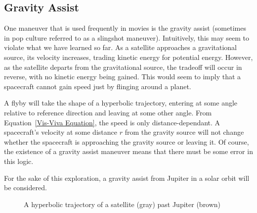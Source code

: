 \documentclass[../basicOrbitalDynamics.tex]{subfiles}
\begin{document}
\bigskip\bigskip
\subsection{Gravity Assist}

One maneuver that is used frequently in movies is the gravity assist (sometimes in pop culture referred to as a slingshot maneuver). Intuitively, this may seem to violate what we have learned so far. As a satellite approaches a gravitational source, its velocity increases, trading kinetic energy for potential energy. However, as the satellite departs from the gravitational source, the tradeoff will occur in reverse, with no kinetic energy being gained. This would seem to imply that a spacecraft cannot gain speed just by flinging around a planet.

A flyby will take the shape of a hyperbolic trajectory, entering at some angle relative to reference direction and leaving at some other angle. From Equation~\eqref{Vis-Viva Equation}, the speed is only distance-dependant. A spacecraft's velocity at some distance $r$ from the gravity source will not change whether the spacecraft is approaching the gravity source or leaving it. Of course, the existence of a gravity assist maneuver means that there must be some error in this logic.

For the sake of this exploration, a gravity assist from Jupiter in a solar orbit will be considered.

\begin{figure}[H]
    \centering
    \caption{A hyperbolic trajectory of a satellite (gray) past Jupiter (brown)}\label{fig:Jupiter Flyby}
\end{figure}
\end{document}

